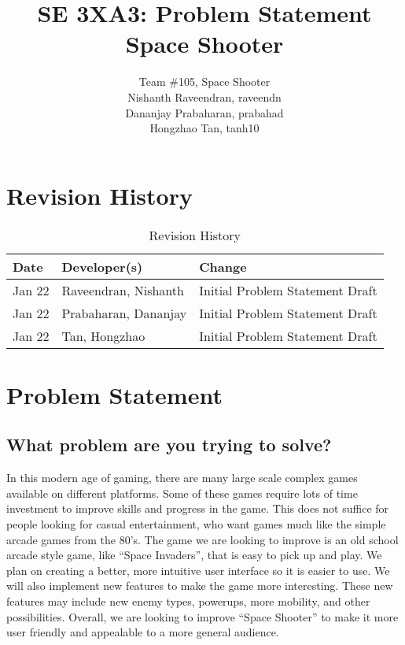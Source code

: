 \documentclass{article}
\title{SE 3XA3: Problem Statement\\Space Shooter}
\author{Team \#105, Space Shooter
		\\ Nishanth Raveendran, raveendn
		\\ Dananjay Prabaharan, prabahad
		\\ Hongzhao Tan, tanh10
}
\date{}
\begin{document}
\maketitle

\newpage

\section{Revision History}

\begin{table}[hp]
\caption{Revision History} \label{TblRevisionHistory}
\begin{tabularx}{\textwidth}{llX}
\toprule
\textbf{Date} & \textbf{Developer(s)} & \textbf{Change}\\
\midrule
Jan 22 & Raveendran, Nishanth & Initial Problem Statement Draft\\
Jan 22 & Prabaharan, Dananjay & Initial Problem Statement Draft\\
Jan 22 & Tan, Hongzhao & Initial Problem Statement Draft\\
\bottomrule
\end{tabularx}
\end{table}

\newpage
\section{Problem Statement}

\subsection{What problem are you trying to solve?}

In this modern age of gaming, there are many large scale complex games available on different platforms. Some of these games require lots of time investment to improve skills and progress in the game. This does not suffice for people looking for casual entertainment, who want games much like the simple arcade games from the 80’s. The game we are looking to improve is an old school arcade style game, like “Space Invaders”, that is easy to pick up and play. We plan on creating a better, more intuitive user interface so it is easier to use. We will also implement new features to make the game more interesting. These new features may include new enemy types, powerups, more mobility, and other possibilities. Overall, we are looking to improve “Space Shooter” to make it more user friendly and appealable to a more general audience. 
\end{document}
